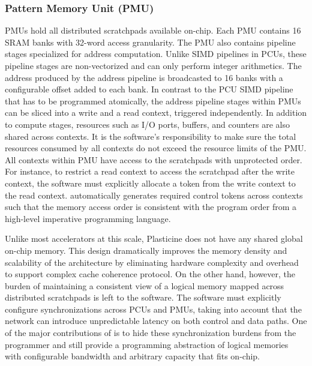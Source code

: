 \subsubsection{Pattern Memory Unit (PMU)}
PMUs hold all distributed scratchpads available on-chip. 
Each PMU contains 16 SRAM banks with
32-word access granularity. The PMU also contains pipeline stages specialized for address
computation. Unlike SIMD pipelines in PCUs, these pipeline stages are non-vectorized and can only perform integer arithmetics. 
The address produced by the address pipeline is broadcasted to 16 banks with a configurable offset added to each bank.
In contrast to the PCU SIMD pipeline that has to be programmed atomically, the address pipeline stages within PMUs can be sliced into a write and a read context, triggered independently.
In addition to compute stages, resources such as I/O ports, buffers, and counters are also shared across contexts.
It is the software's responsibility to make sure the total resources consumed by all
contexts do not exceed the resource limits of the PMU.
All contexts within PMU have access to the scratchpads with unprotected order. For instance, to
restrict a read context to access the scratchpad after the write context, the software must explicitly allocate
a token from the write context to the read context.
\name automatically generates required control tokens across contexts such that the memory access order is
consistent with the program order from a high-level imperative programming language.

Unlike most accelerators at this scale, Plasticine does not have any shared global on-chip memory. 
This design dramatically improves the memory density and scalability of the architecture 
by eliminating hardware complexity and overhead to support complex cache coherence protocol.
On the other hand, however, the burden of maintaining a consistent view of a logical memory mapped
across distributed scratchpads is left to the software.
The software must explicitly configure synchronizations across PCUs and PMUs, taking into account
that the network can introduce unpredictable latency on both control and data paths.
One of the major contributions of \name is to hide these synchronization burdens from the programmer and still provide a programming abstraction of logical memories with configurable bandwidth and arbitrary capacity that fits on-chip.

